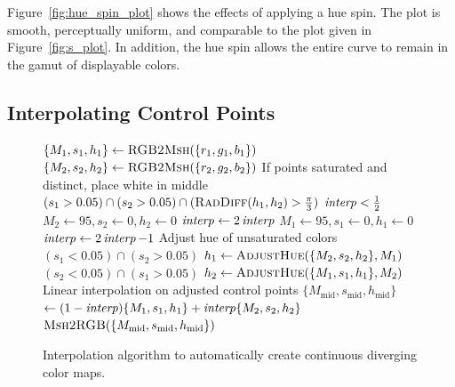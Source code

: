 \documentclass{acmsiggraph}               %
\begin{document}
Figure~\ref{fig:hue_spin_plot} shows the effects of applying a hue spin.
The plot is smooth, perceptually uniform, and comparable to the plot given
in Figure~\ref{fig:s_plot}.  In addition, the hue spin allows the entire
curve to remain in the gamut of displayable colors.


\subsection{Interpolating Control Points}
\label{sec:InterpolatingControlPoints}

\begin{figure}
  \begin{codebox}
    \li $\{M_1,s_1,h_1\} \leftarrow \textnormal{\scshape RGB2Msh}(\{r_1,g_1,b_1\})$
    \li $\{M_2,s_2,h_2\} \leftarrow \textnormal{\scshape RGB2Msh}(\{r_2,g_2,b_2\})$
    \zi \Comment If points saturated and distinct, place white in middle
    \li \If $(s_1 > 0.05) \cap (s_2 > 0.05)
             \cap (\textnormal{\scshape RadDiff}(h_1,h_2) > \frac{\pi}{3})$
	\label{code:InterpolateColor:AddWhiteBegin}
    \li \Then \If $\id{interp} < \frac{1}{2}$
    \li       \Then $M_2 \leftarrow 95, s_2 \leftarrow 0, h_2 \leftarrow 0$
    \li             $\id{interp} \leftarrow 2\id{interp}$
    \li       \Else $M_1 \leftarrow 95, s_1 \leftarrow 0, h_1 \leftarrow 0$
    \li             $\id{interp} \leftarrow 2\id{interp} - 1$
              \End
        \End
	\label{code:InterpolateColor:AddWhiteEnd}
    \zi \Comment Adjust hue of unsaturated colors
    \li \If $(s_1 < 0.05) \cap (s_2 > 0.05)$
        \label{code:InterpolateColor:AdjustHueBegin}
    \li \Then $h_1 \leftarrow \textnormal{\scshape AdjustHue}(\{M_2,s_2,h_2\},M_1)$
    \li \ElseIf $(s_2 < 0.05) \cap (s_1 > 0.05)$
    \li \Then $h_2 \leftarrow \textnormal{\scshape AdjustHue}(\{M_1,s_1,h_1\},M_2)$
        \End
	\label{code:InterpolateColor:AdjustHueEnd}
    \zi \Comment Linear interpolation on adjusted control points
    \li $\{M_\mathrm{mid},s_\mathrm{mid},h_\mathrm{mid}\}$
    \zi \>$\leftarrow (1-\id{interp})\{M_1,s_1,h_1\}+\id{interp}\{M_2,s_2,h_2\}$
        \label{code:InterpolateColor:LinearInterpolate}
    \li \Return $\textnormal{\scshape Msh2RGB}(\{M_\mathrm{mid},s_\mathrm{mid},h_\mathrm{mid}\})$
  \end{codebox}
  \caption{Interpolation algorithm to automatically create continuous
    diverging color maps.}
  \label{fig:InterpolateColor}
\end{figure}
\end{document}
